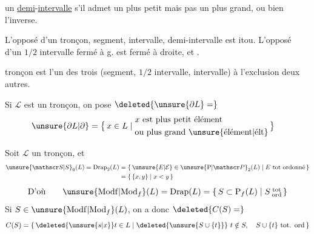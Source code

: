 un \uline{demi}-\uline{intervalle} s'il admet un plus petit  mais pas un plus grand, ou bien l'inverse.

 L'opposé d'un tronçon, segment, intervalle, demi-intervalle est itou. L'opposé d'un $1/2$ intervalle fermé à g. est fermé à droite, et .

 tronçon est l'un des trois (segment, $1/2$ intervalle, intervalle) à l'exclusion  deux autres.

Si $\mathcal L$ est un tronçon, on pose $\deleted{\unsure{\partial L}=}$
\[
\begin{aligned}
\unsure{\partial L|\partial}&=\bigl\{\,x\in L\mid
\begin{aligned}&x\text{ est plus petit élément}\\
&\text{ou plus grand \unsure{élément|élt}}\end{aligned}\,\bigr\}
\end{aligned}
\]

Soit $\mathcal L$ un tronçon, et
\[
\begin{aligned}
\unsure{\mathscr S|S}_0(L)=\mathrm{Drap}_2(L)&=\{\,\unsure{E|\mathcal E}\in\unsure{\mathrm P|\mathscr P}_2(L)\mid E\text{ tot ordonné}\,\}\\
&=\{\,\{x,y\}\mid x<y\,\}
\end{aligned}
\]
\[
\text{D'où}\qquad \unsure{\mathrm{Modf}|\mathrm{Mod}_{f}}(L)=\mathrm{Drap}(L)
=\{\,S\subset\mathrm P_f(L)\mid S\,\substack{\text{tot}\\\text{ord}}\,\}
\]
Si $S\in\unsure{\mathrm{Modf}|\mathrm{Mod}_{f}}(L)$, on a donc $\deleted{C(S)=}$
\[
C(S)=\{\,\deleted{\unsure{s|x}}t\in L\mid\deleted{\unsure{S\cup\{t\}}}\ t\notin S,\quad S\cup\{t\}\ \text{tot. ord}\,\}
\]


